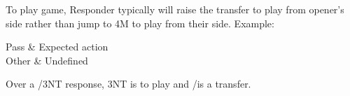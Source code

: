 \documentclass[tom-ari]{subfiles}
\begin{document}
To play game, Responder typically will raise the transfer to play from opener's side rather than jump to 4M to play from their side.  Example:

\begin{bidtable}{
\begin{auctionhead}
\end{auctionhead}
}
Pass & Expected action \\
Other & Undefined \\
\end{bidtable}

Over a /3NT response, 3NT is to play and /\hhh is a transfer.
\end{document}
